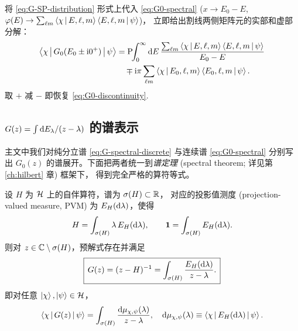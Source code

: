 \begin{remark}[作用到 $G_0$ 上]
将 \eqref{eq:G-SP-distribution} 形式上代入 \eqref{eq:G0-spectral}
($x\to E_0-E$, $\varphi(E)\to\sum_{\ell m}\left\langle \chi \,\middle|\, E,\ell,m \right\rangle\left\langle E,\ell,m \,\middle|\, \psi \right\rangle$)，
立即给出割线两侧矩阵元的实部和虚部分解：
\begin{align}
  \left\langle \chi \,\middle|\, G_0(E_0\pm\mathrm{i} 0^+) \,\middle|\, \psi \right\rangle
  &= \mathrm{P}\!\!\int_0^\infty\mathrm{d} E\,
     \frac{\sum_{\ell m}\left\langle \chi \,\middle|\, E,\ell,m \right\rangle\left\langle E,\ell,m \,\middle|\, \psi \right\rangle}{E_0-E}\notag\\
  &\quad\mp\mathrm{i}\pi
     \sum_{\ell m}\left\langle \chi \,\middle|\, E_0,\ell,m \right\rangle\left\langle E_0,\ell,m \,\middle|\, \psi \right\rangle.
  \label{eq:G-SP-on-G0}
\end{align}
取 $+$ 减 $-$ 即恢复 \eqref{eq:G0-discontinuity}.
\end{remark}

\subsection{$G(z)=\int\mathrm{d} E_\lambda/(z-\lambda)$ 的谱表示}

主文中我们对纯分立谱 \eqref{eq:G-spectral-discrete} 与连续谱 \eqref{eq:G0-spectral}
分别写出 $G_0(z)$ 的谱展开。下面把两者统一到\emph{谱定理}
(spectral theorem; 详见第 \ref{ch:hilbert} 章) 框架下，
得到完全严格的算符等式。

\begin{theorem}[$G(z)$ 的谱表示]\label{thm:G-spectral}
设 $H$ 为 $\mathcal{H}$ 上的自伴算符，谱为 $\sigma(H)\subset\mathbb{R}$，
对应的投影值测度 (projection-valued measure, PVM)
为 $E_H(\mathrm{d}\lambda)$，使得
\begin{equation}\label{eq:G-spectral-thm-input}
  H = \int_{\sigma(H)} \lambda\,E_H(\mathrm{d}\lambda),\qquad
  \mathbf 1 = \int_{\sigma(H)} E_H(\mathrm{d}\lambda).
\end{equation}
则对 $z\in\mathbb{C}\setminus\sigma(H)$，预解式存在并满足
\begin{equation}\label{eq:G-spectral-thm}
  \boxed{\,G(z) = (z-H)^{-1}
   = \int_{\sigma(H)} \frac{E_H(\mathrm{d}\lambda)}{z-\lambda}.\,}
\end{equation}
即对任意 $\ket\chi,\ket\psi\in\mathcal{H}$，
\begin{equation}
  \left\langle \chi \,\middle|\, G(z) \,\middle|\, \psi \right\rangle
  = \int_{\sigma(H)} \frac{\mathrm{d}\mu_{\chi,\psi}(\lambda)}{z-\lambda},
  \quad
  \mathrm{d}\mu_{\chi,\psi}(\lambda)\equiv \left\langle \chi \,\middle|\, E_H(\mathrm{d}\lambda) \,\middle|\, \psi \right\rangle.
\end{equation}
\end{theorem}

